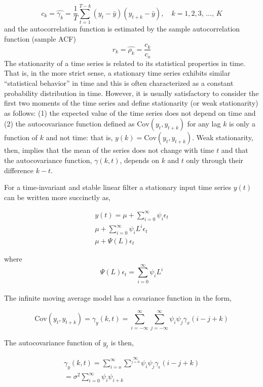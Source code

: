 \documentclass[
  11pt,
]{article}
\begin{document}
\[
c_{k} = \hat{\gamma_{k}} = \frac{1}{T} \sum\limits_{t = 1}^{T-k}(y_{t} -\bar{y})(y_{t+k} - \bar{y}), \quad k = 1, 2, 3,\, \ldots,\, K
\] and the autocorrelation function is estimated by the sample
autocorrelation function (sample ACF) \[
r_{k} = \hat{\rho_{k}} = \frac{c_{k}}{c_{o}}
\] The stationarity of a time series is related to its statistical
properties in time. That is, in the more strict sense, a stationary time
series exhibits similar ``statistical behavior'' in time and this is
often characterized as a constant probability distribution in time.
However, it is usually satisfactory to consider the first two moments of
the time series and define stationarity (or weak stationarity) as
follows: (1) the expected value of the time series does not depend on
time and (2) the autocovariance function defined as
\(\mathrm{Cov}(y_{t}, y_{t+k})\) for any lag \(k\) is only a function of
\(k\) and not time: that is, \(y(k) = \mathrm{Cov}(y_{t}, y_{t+k})\).
Weak stationarity, then, implies that the mean of the series does not
change with time \(t\) and that the autocovariance function,
\(\gamma(k, t)\), depends on \(k\) and \(t\) only through their
difference \(k - t\).

For a time-invariant and stable linear filter a stationary input time
series \(y(t)\) can be written more succinctly as,

\begin{gather*}
y(t) = \mu + \sum\limits_{i= 0}^{\infty}\psi_{i}\epsilon_{t} \\[8pt]
\mu + \sum\limits_{i=0}^{\infty}\psi_{i}L^{i}\epsilon_{t} \\[8pt]
\mu + \Psi(L)\epsilon_{t}
\end{gather*}

where \[
  \Psi(L)\epsilon_{t} = \sum\limits_{i=0}^{\infty}\psi_{i}L^{i}
  \]\\
The infinite moving average model has a covariance function in the form,

\[
\mathrm{Cov}(y_{t}, y_{t+k}) = \gamma_{y}(k, t) = \sum\limits_{i = -\infty}^{\infty}\sum\limits_{j = - \infty}^{\infty}\psi_{i}\psi_{j}\gamma_{x}(i - j + k)
\]

The autocovariance function of \(y_{t}\) is then,

\begin{gather*}
\gamma_{y}(k, t) = \sum\limits_{i = o}^{\infty}\sum^{\infty}\limits_{j = 0} \psi_{i}\psi_{j}\gamma_{\epsilon}(i-j+k) \\[8pt]
= \sigma^{2}\sum\limits_{i = 0}^{\infty}\psi_{i}\psi_{i + k}
\end{gather*}
\end{document}

